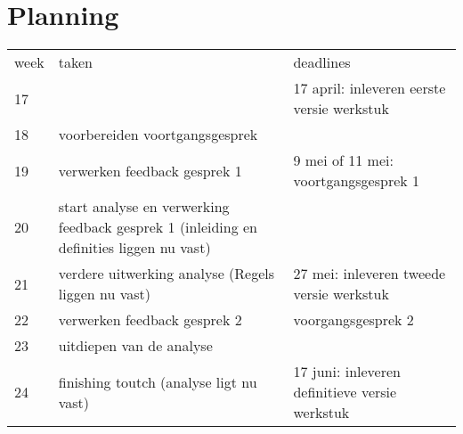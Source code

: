 \section{Planning}
\label{sec:planning}

\begin{tabular}{ l l l }
  week & taken & deadlines \\
  17 &  & 17 april: inleveren eerste versie werkstuk\\
  18 & voorbereiden voortgangsgesprek &  \\
  19 & verwerken feedback gesprek 1 & 9 mei of 11 mei: voortgangsgesprek 1\\
  20 & start analyse en verwerking feedback gesprek 1 (inleiding en definities liggen nu vast) & \\
  21 & verdere uitwerking analyse (Regels liggen nu vast)& 27 mei: inleveren tweede versie werkstuk\\
  22 & verwerken feedback gesprek 2 & voorgangsgesprek 2\\
  23 & uitdiepen van de analyse & \\
  24 & finishing toutch (analyse ligt nu vast)& 17 juni: inleveren definitieve versie werkstuk\\
\end{tabular}
